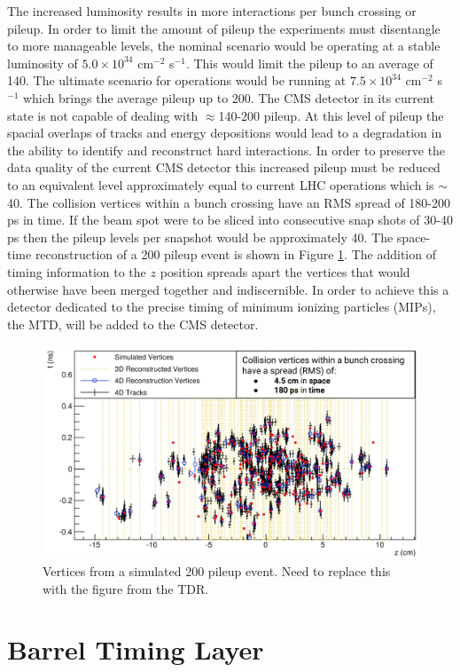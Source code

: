 The increased luminosity results in more interactions per bunch crossing or pileup.  In order to limit the amount of pileup the experiments must disentangle to more manageable levels, the nominal scenario would be operating at a stable luminosity of $5.0\times10^{34}$ cm$^{-2}$ s$^{-1}$.  This would limit the pileup to an average of 140.  The ultimate scenario for operations would be running at $7.5\times10^{34}$ cm$^{-2}$ s$^{-1}$ which brings the average pileup up to 200.  The CMS detector in its current state is not capable of dealing with $\approx$140-200 pileup.  At this level of pileup the spacial overlaps of tracks and energy depositions would lead to a degradation in the ability to identify and reconstruct hard interactions. In order to preserve the data quality of the current CMS detector this increased pileup must be reduced to an equivalent level approximately equal to current LHC operations which is $\sim$40.  The collision vertices within a bunch crossing have an RMS spread of 180-200 ps in time.  If the beam spot were to be sliced into consecutive snap shots of 30-40 ps then the pileup levels per snapshot would be approximately 40.  The space-time reconstruction of a 200 pileup event is shown in Figure \ref{fig:pileup4d}.  The addition of timing information to the $z$ position spreads apart the vertices that would otherwise have been merged together and indiscernible.  In order to achieve this a detector dedicated to the precise timing of minimum ionizing particles (MIPs), the MTD, will be added to the CMS detector.



\begin{figure}[h]
	\centering
	\includegraphics[width=0.7\linewidth]{Figures/Pileup_4D}
	\caption{Vertices from a simulated 200 pileup event.  Need to replace this with the figure from the TDR. }
	\label{fig:pileup4d}
\end{figure}





\section{Barrel Timing Layer}
 


